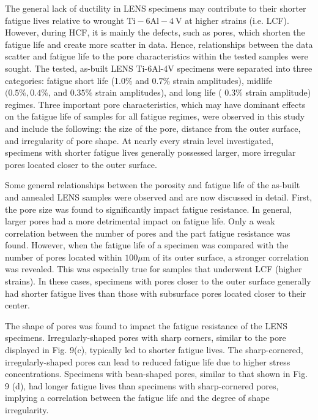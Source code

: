\documentclass[10pt]{article}
\begin{document}
The general lack of ductility in LENS specimens may contribute to their shorter fatigue lives relative to wrought $\mathrm{Ti}-6 \mathrm{Al}-4 \mathrm{~V}$ at higher strains (i.e. LCF). However, during HCF, it is mainly the defects, such as pores, which shorten the fatigue life and create more scatter in data. Hence, relationships between the data scatter and fatigue life to the pore characteristics within the tested samples were sought. The tested, as-built LENS Ti-6Al-4V specimens were separated into three categories: fatigue short life (1.0\% and $0.7 \%$ strain amplitudes), midlife $(0.5 \%, 0.4 \%$, and $0.35 \%$ strain amplitudes), and long life ( $0.3 \%$ strain amplitude) regimes. Three important pore characteristics, which may have dominant effects on the fatigue life of samples for all fatigue regimes, were observed in this study and include the following: the size of the pore, distance from the outer surface, and irregularity of pore shape. At nearly every strain level investigated, specimens with shorter fatigue lives generally possessed larger, more irregular pores located closer to the outer surface.

Some general relationships between the porosity and fatigue life of the as-built and annealed LENS samples were observed and are now discussed in detail. First, the pore size was found to significantly impact fatigue resistance. In general, larger pores had a more detrimental impact on fatigue life. Only a weak correlation between the number of pores and the part fatigue resistance was found. However, when the fatigue life of a specimen was compared with the number of pores located within $100 \mu \mathrm{m}$ of its outer surface, a stronger correlation was revealed. This was especially true for samples that underwent LCF (higher strains). In these cases, specimens with pores closer to the outer surface generally had shorter fatigue lives than those with subsurface pores located closer to their center.

The shape of pores was found to impact the fatigue resistance of the LENS specimens. Irregularly-shaped pores with sharp corners, similar to the pore displayed in Fig. 9(c), typically led to shorter fatigue lives. The sharp-cornered, irregularly-shaped pores can lead to reduced fatigue life due to higher stress concentrations. Specimens with bean-shaped pores, similar to that shown in Fig. 9 (d), had longer fatigue lives than specimens with sharp-cornered pores, implying a correlation between the fatigue life and the degree of shape irregularity.
\end{document}
